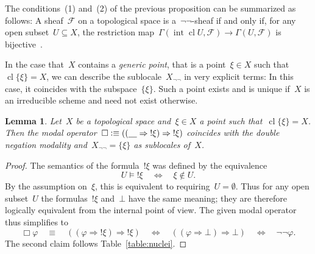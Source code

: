 \documentclass[10pt]{amsart}
\theoremstyle{definition}
\theoremstyle{plain}
\newtheorem{lemma}[defn]{Lemma}
\theoremstyle{remark}
\newcommand{\F}{\mathcal{F}}
\newcommand{\placeholder}{\underline{\quad}}
\DeclareMathOperator{\Int}{int}
\DeclareMathOperator{\Clos}{cl}
\newcommand{\?}{\,{:}\,}
\renewcommand{\_}{\mathpunct{.}\,}
\newcommand{\notat}[1]{{!#1}}
\newcommand{\defequiv}{\vcentcolon\equiv}
\begin{document}
The conditions~(1) and~(2) of the previous proposition can be
summarized as follows: A sheaf~$\F$ on a topological space is
a~$\neg\neg$-sheaf if and only if, for any open subset~$U \subseteq X$, the
restriction map~$\Gamma(\Int\Clos U, \F) \to \Gamma(U,\F)$ is
bijective~\cite[Lemma~36]{jackson:sheaf-theoretic-measure-theory}.

In the case that~$X$ contains a \emph{generic point}, that is a point~$\xi \in X$
such that~$\Clos\{\xi\} = X$, we can describe the sublocale~$X_{\neg\neg}$ in
very explicit terms: In this case, it coincides with the subspace~$\{\xi\}$.
Such a point exists and is unique if~$X$ is an irreducible scheme and need not
exist otherwise.

\begin{lemma}\label{lemma:negneg-generic-point}
Let~$X$ be a topological space and~$\xi \in X$ a point such
that~$\Clos\{\xi\} = X$. Then the modal operator~$\Box \defequiv ((\placeholder
\Rightarrow \notat{\xi}) \Rightarrow \notat{\xi})$ coincides with the double
negation modality and~$X_{\neg\neg} = \{\xi\}$ as sublocales of~$X$.\end{lemma}
\begin{proof}The semantics of the formula~$\notat{\xi}$ was defined by the
equivalence
\[ U \models \notat{\xi} \quad\Longleftrightarrow\quad
  \xi \not\in U. \]
By the assumption on~$\xi$, this is equivalent to requiring~$U = \emptyset$.
Thus for any open subset~$U$ the formulas~$\notat{\xi}$ and~$\bot$ have the
same meaning; they are therefore logically equivalent from the internal point of
view. The given modal operator thus simplifies to
\[ \Box\varphi \quad\equiv\quad ((\varphi \Rightarrow \notat{\xi}) \Rightarrow \notat{\xi})
  \quad\Leftrightarrow\quad ((\varphi \Rightarrow \bot) \Rightarrow \bot)
  \quad\Leftrightarrow\quad \neg\neg\varphi. \]
The second claim follows Table~\ref{table:nuclei}.
\end{proof}
\end{document}
